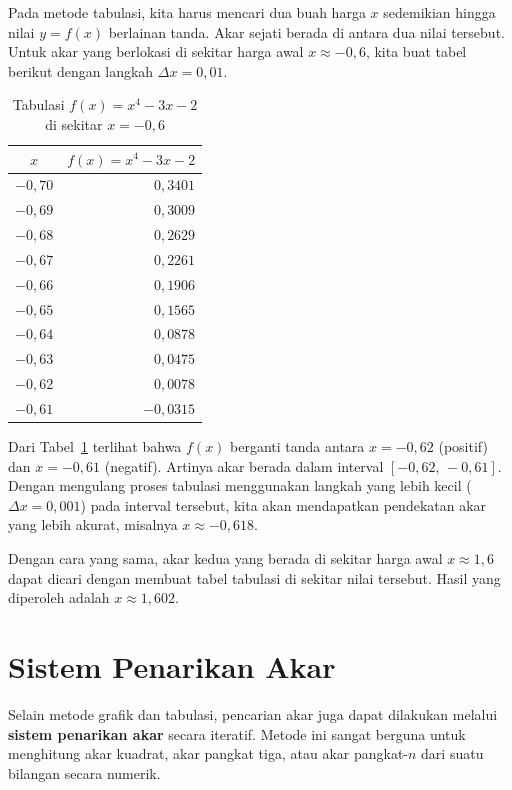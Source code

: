 Pada metode tabulasi, kita harus mencari dua buah harga $x$ sedemikian hingga nilai $y = f(x)$ berlainan tanda. Akar sejati berada di antara dua nilai tersebut. Untuk akar yang berlokasi di sekitar harga awal $x \approx -0{,}6$, kita buat tabel berikut dengan langkah $\Delta x = 0{,}01$.

\begin{table}[!htbp]
\centering
\caption{Tabulasi $f(x) = x^4 - 3x - 2$ di sekitar $x = -0{,}6$}
\label{tabel:tabulasi1}
\begin{tabular}{|c|r|}
\hline
$x$ & $f(x) = x^4 - 3x - 2$ \\ \hline
$-0{,}70$ & $\phantom{-}0{,}3401$ \\
$-0{,}69$ & $\phantom{-}0{,}3009$ \\
$-0{,}68$ & $\phantom{-}0{,}2629$ \\
$-0{,}67$ & $\phantom{-}0{,}2261$ \\
$-0{,}66$ & $\phantom{-}0{,}1906$ \\
$-0{,}65$ & $\phantom{-}0{,}1565$ \\
$-0{,}64$ & $\phantom{-}0{,}0878$ \\
$-0{,}63$ & $\phantom{-}0{,}0475$ \\
$-0{,}62$ & $\phantom{-}0{,}0078$ \\
$-0{,}61$ & $-0{,}0315$ \\ \hline
\end{tabular}
\end{table}

Dari Tabel~\ref{tabel:tabulasi1} terlihat bahwa $f(x)$ berganti tanda antara $x = -0{,}62$ (positif) dan $x = -0{,}61$ (negatif). Artinya akar berada dalam interval $[-0{,}62,\, -0{,}61]$. Dengan mengulang proses tabulasi menggunakan langkah yang lebih kecil ($\Delta x = 0{,}001$) pada interval tersebut, kita akan mendapatkan pendekatan akar yang lebih akurat, misalnya $x \approx -0{,}618$.

Dengan cara yang sama, akar kedua yang berada di sekitar harga awal $x \approx 1{,}6$ dapat dicari dengan membuat tabel tabulasi di sekitar nilai tersebut. Hasil yang diperoleh adalah $x \approx 1{,}602$.


\section{Sistem Penarikan Akar}

Selain metode grafik dan tabulasi, pencarian akar juga dapat dilakukan melalui \textbf{sistem penarikan akar} secara iteratif. Metode ini sangat berguna untuk menghitung akar kuadrat, akar pangkat tiga, atau akar pangkat-$n$ dari suatu bilangan secara numerik.

